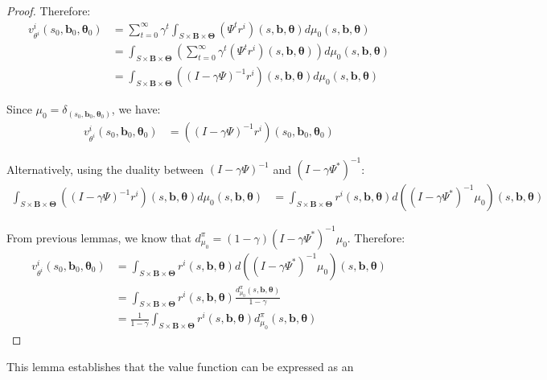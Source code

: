 \documentclass[a4paper,12pt]{report}
\begin{document}
\begin{proof}
    Therefore:
    \begin{align}
        v^{i}_{\theta^i}(s_{0}, \boldsymbol{b}_{0}, \boldsymbol{\theta}_{0}) & = \sum_{t=0}^{\infty}\gamma^{t} \int_{S \times \boldsymbol{B} \times \boldsymbol{\Theta}}(\Psi^{t} r^{i})(s, \boldsymbol{b}, \boldsymbol{\theta}) d\mu_{0}(s, \boldsymbol{b}, \boldsymbol{\theta})              \\
                                                                             & = \int_{S \times \boldsymbol{B} \times \boldsymbol{\Theta}}\left(\sum_{t=0}^{\infty}\gamma^{t} (\Psi^{t} r^{i})(s, \boldsymbol{b}, \boldsymbol{\theta})\right) d\mu_{0}(s, \boldsymbol{b}, \boldsymbol{\theta}) \\
                                                                             & = \int_{S \times \boldsymbol{B} \times \boldsymbol{\Theta}}((I - \gamma \Psi)^{-1}r^{i})(s, \boldsymbol{b}, \boldsymbol{\theta}) d\mu_{0}(s, \boldsymbol{b}, \boldsymbol{\theta})
    \end{align}

    Since $\mu_{0} = \delta_{(s_0, \boldsymbol{b}_0, \boldsymbol{\theta}_0)}$, we have:
    \begin{align}
        v^{i}_{\theta^i}(s_{0}, \boldsymbol{b}_{0}, \boldsymbol{\theta}_{0}) & = ((I - \gamma \Psi)^{-1}r^{i})(s_{0}, \boldsymbol{b}_{0}, \boldsymbol{\theta}_{0})
    \end{align}

    Alternatively, using the duality between $(I - \gamma \Psi)^{-1}$ and
    $(I - \gamma \Psi^{*})^{-1}$:
    \begin{align}
        \int_{S \times \boldsymbol{B} \times \boldsymbol{\Theta}}((I - \gamma \Psi)^{-1}r^{i})(s, \boldsymbol{b}, \boldsymbol{\theta}) d\mu_{0}(s, \boldsymbol{b}, \boldsymbol{\theta}) & = \int_{S \times \boldsymbol{B} \times \boldsymbol{\Theta}}r^{i}(s, \boldsymbol{b}, \boldsymbol{\theta}) d((I - \gamma \Psi^{*})^{-1}\mu_{0})(s, \boldsymbol{b}, \boldsymbol{\theta})
    \end{align}

    From previous lemmas, we know that $d^{\pi}_{\mu_0}= (1-\gamma) (I - \gamma \Psi
        ^{*})^{-1}\mu_{0}$. Therefore:
    \begin{align}
        v^{i}_{\theta^i}(s_{0}, \boldsymbol{b}_{0}, \boldsymbol{\theta}_{0}) & = \int_{S \times \boldsymbol{B} \times \boldsymbol{\Theta}}r^{i}(s, \boldsymbol{b}, \boldsymbol{\theta}) d((I - \gamma \Psi^{*})^{-1}\mu_{0})(s, \boldsymbol{b}, \boldsymbol{\theta}) \\
                                                                             & = \int_{S \times \boldsymbol{B} \times \boldsymbol{\Theta}}r^{i}(s, \boldsymbol{b}, \boldsymbol{\theta}) \frac{d^{\pi}_{\mu_0}(s, \boldsymbol{b}, \boldsymbol{\theta})}{1-\gamma}     \\
                                                                             & = \frac{1}{1-\gamma}\int_{S \times \boldsymbol{B} \times \boldsymbol{\Theta}}r^{i}(s, \boldsymbol{b}, \boldsymbol{\theta}) d^{\pi}_{\mu_0}(s, \boldsymbol{b}, \boldsymbol{\theta})
    \end{align}
\end{proof}This lemma establishes that the value function can be expressed as an
\end{document}
